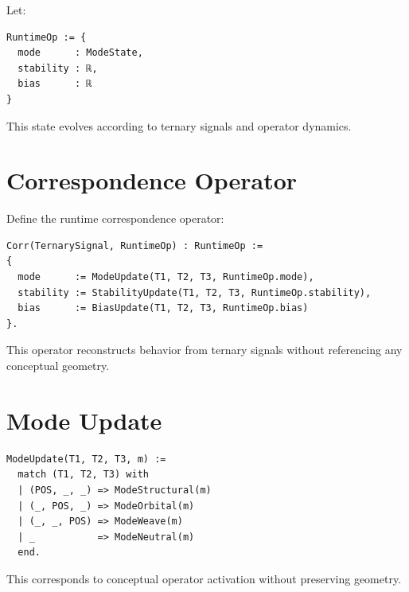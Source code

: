 \documentclass[11pt]{article}
\begin{document}
Let:

\begin{verbatim}
RuntimeOp := {
  mode      : ModeState,
  stability : ℝ,
  bias      : ℝ
}
\end{verbatim}

This state evolves according to ternary signals and operator dynamics.

\newpage


\section{Correspondence Operator}

Define the runtime correspondence operator:

\begin{verbatim}
Corr(TernarySignal, RuntimeOp) : RuntimeOp :=
{
  mode      := ModeUpdate(T1, T2, T3, RuntimeOp.mode),
  stability := StabilityUpdate(T1, T2, T3, RuntimeOp.stability),
  bias      := BiasUpdate(T1, T2, T3, RuntimeOp.bias)
}.
\end{verbatim}

This operator reconstructs behavior from ternary signals without referencing
any conceptual geometry.

\newpage


\section{Mode Update}

\begin{verbatim}
ModeUpdate(T1, T2, T3, m) :=
  match (T1, T2, T3) with
  | (POS, _, _) => ModeStructural(m)
  | (_, POS, _) => ModeOrbital(m)
  | (_, _, POS) => ModeWeave(m)
  | _           => ModeNeutral(m)
  end.
\end{verbatim}

This corresponds to conceptual operator activation without preserving geometry.

\newpage

\end{document}
